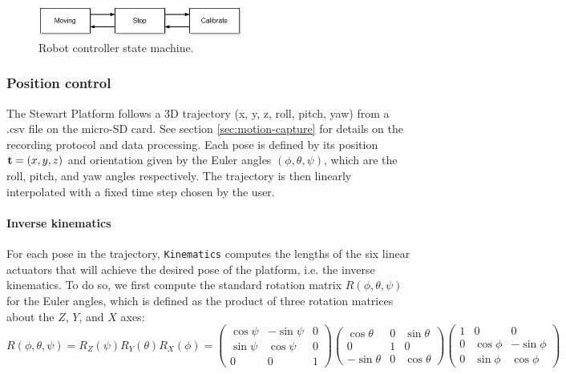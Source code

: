 \begin{figure}[H]
\centering
\includegraphics[width=0.6\textwidth]{figures/state_machine.drawio.png}
\caption{Robot controller state machine.}
\label{fig:state_machine}
\end{figure}

\subsubsection{Position control}

The Stewart Platform follows a 3D trajectory (x, y, z, roll, pitch, yaw) from a .csv file on the micro-SD card.
See section \ref{sec:motion-capture} for details on the recording protocol and data processing.
Each pose is defined by its position ${\bf t}=(x,y,z)$ and orientation given by the Euler angles $(\phi,\theta,\psi)$,
 which are the roll, pitch, and yaw angles respectively.
The trajectory is then linearly interpolated with a fixed time step chosen by the user.

\paragraph{Inverse kinematics}
For each pose in the trajectory, \texttt{Kinematics} computes the lengths of the six linear actuators that will achieve 
the desired pose of the platform, i.e. the inverse kinematics. To do so, we first compute the standard rotation matrix 
$R(\phi,\theta,\psi)$ for the Euler angles, which is defined as the product of three rotation matrices about 
the $Z$, $Y$, and $X$ axes:
\[
R(\phi,\theta,\psi) = R_Z(\psi) R_Y(\theta) R_X(\phi) =
\begin{pmatrix}
\cos\psi & -\sin\psi & 0 \\
\sin\psi & \cos\psi & 0 \\
0 & 0 & 1
\end{pmatrix}
\begin{pmatrix}
\cos\theta & 0 & \sin\theta \\
0 & 1 & 0 \\
-\sin\theta & 0 & \cos\theta
\end{pmatrix}
\begin{pmatrix}
1 & 0 & 0 \\
0 & \cos\phi & -\sin\phi \\
0 & \sin\phi & \cos\phi
\end{pmatrix}
\]

